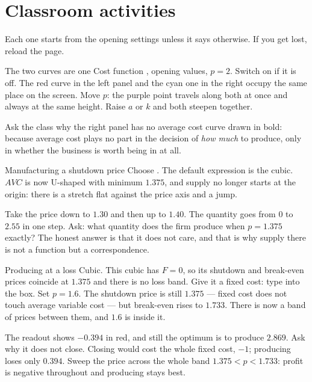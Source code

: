 \documentclass[11pt,a4paper]{appletmanual}
\begin{document}

\section{Classroom activities}

Each one starts from the opening settings unless it says otherwise. If you get
lost, reload the page.

\begin{activity}{The two curves are one}
\amset Cost function , opening values, $p = 2$. Switch
 on if it is off.
\amexp The red curve in the left panel and the cyan one in the right occupy the
same place on the screen. Move $p$: the purple point travels along both at once
and always at the same height. Raise $a$ or $k$ and both steepen together.
\par\smallskip
Ask the class why the right panel has no average cost curve drawn in bold:
because average cost plays no part in the decision of \emph{how much} to
produce, only in whether the business is worth being in at all.
\end{activity}

\begin{activity}{Manufacturing a shutdown price}
\amset Choose . The default expression is the cubic.
\amexp $AVC$ is now U-shaped with minimum $1.375$, and supply no longer starts
at the origin: there is a stretch flat against the price axis and a jump.
\par\smallskip
Take the price down to $1.30$ and then up to $1.40$. The quantity goes from $0$
to $2.55$ in one step. Ask: what quantity does the firm produce when
$p = 1.375$ exactly? The honest answer is that it does not care, and that is
why supply there is not a function but a correspondence.
\end{activity}

\begin{activity}{Producing at a loss}
\amset Cubic. This cubic has $F = 0$, so its shutdown and break-even prices
coincide at $1.375$ and there is no loss band. Give it a fixed cost: type
 into the box. Set $p = 1.6$.
\amexp The shutdown price is still $1.375$ --- fixed cost does not touch
average variable cost --- but break-even rises to $1.733$. There is now a band
of prices between them, and $1.6$ is inside it.
\par\smallskip
The  readout shows $-0.394$ in red, and still the optimum is to
produce $2.869$. Ask why it does not close. Closing would cost the whole fixed
cost, $-1$; producing loses only $0.394$. Sweep the price across the whole band
$1.375 < p < 1.733$: profit is negative throughout and producing stays best.
\end{activity}
\end{document}
